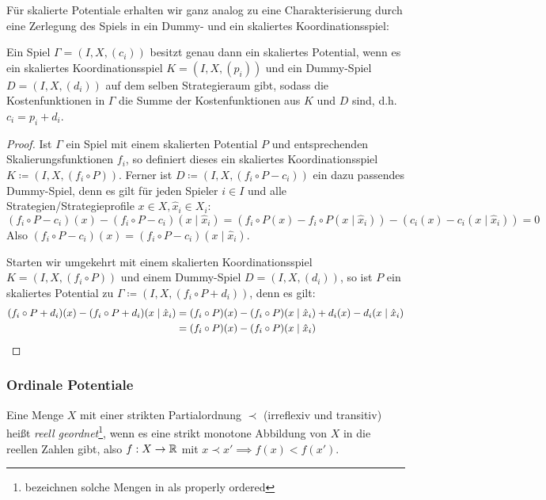 Für skalierte Potentiale erhalten wir ganz analog zu  eine Charakterisierung durch eine Zerlegung des Spiels in ein Dummy- und ein skaliertes Koordinationsspiel:

\begin{satz}\label{satz:CharSkalPot}
	Ein Spiel $\Gamma = (I, X, (c_i))$ besitzt genau dann ein skaliertes Potential, wenn es ein skaliertes Koordinationsspiel $K = (I, X, (p_i))$ und ein Dummy-Spiel $D = (I, X, (d_i))$ auf dem selben Strategieraum gibt, sodass die Kostenfunktionen in $\Gamma$ die Summe der Kostenfunktionen aus $K$ und $D$ sind, d.h. $c_i = p_i + d_i$.
\end{satz}

\begin{proof}
	Ist $\Gamma$ ein Spiel mit einem skalierten Potential $P$ und entsprechenden Skalierungsfunktionen $f_i$, so definiert dieses ein skaliertes Koordinationsspiel $K \coloneqq (I, X, (f_i \circ P))$. Ferner ist $D \coloneqq (I, X, (f_i\circ P-c_i))$ ein dazu passendes Dummy-Spiel, denn es gilt für jeden Spieler $i \in I$ und alle Strategien/Strategieprofile $x \in X, \hat{x}_i \in X_i$:
	\[(f_i\circ P-c_i)(x) - (f_i\circ P-c_i)(x \mid \hat{x}_i) = \left(f_i\circ P(x) - f_i\circ P(x \mid \hat{x}_i)\right) - \left(c_i(x) - c_i(x \mid \hat{x}_i)\right) = 0 \]
	Also $(f_i\circ P-c_i)(x) = (f_i\circ P-c_i)(x \mid \hat{x}_i)$.
	
	Starten wir umgekehrt mit einem skalierten Koordinationsspiel $K = (I, X, (f_i \circ P))$ und einem Dummy-Spiel $D = (I, X, (d_i))$, so ist $P$ ein skaliertes Potential zu $\Gamma \coloneqq (I, X, (f_i\circ P + d_i))$, denn es gilt:
		\begin{align*}
			(f_i\circ P + d_i)(x) - (f_i\circ P + d_i)(x \mid \hat{x}_i) &= (f_i\circ P)(x) - (f_i\circ P)(x \mid \hat{x}_i) + d_i(x) - d_i(x \mid \hat{x}_i) \\
				&= (f_i\circ P)(x) - (f_i\circ P)(x \mid \hat{x}_i) \qedhere
		\end{align*}
\end{proof}


\subsubsection{Ordinale Potentiale}

\begin{defn}
	Eine Menge $X$ mit einer strikten Partialordnung $\prec$ (irreflexiv und transitiv) heißt \emph{reell geordnet}\footnote{\citeauthor{CharExOrdPot} bezeichnen solche Mengen in \cite{CharExOrdPot} als \glqq properly ordered\grqq}, wenn es eine strikt monotone Abbildung von $X$ in die reellen Zahlen gibt, also $f: X \to \mathbb{R}$ mit $x \prec x' \implies f(x) < f(x')$.
\end{defn}

